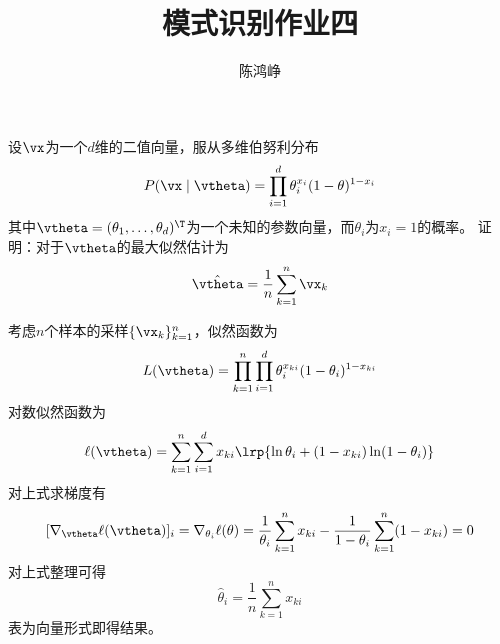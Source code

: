 \documentclass[reportComp]{thesis}
\title{模式识别作业四}
\subtitle{}
\author{陈鸿峥}
\begin{document}
\maketitle

\begin{question}[\textsection 3 Q4]
设$\vx$为一个$d$维的二值向量，服从多维伯努利分布
\[P(\vx\mid\vtheta)=\prod_{i=1}^d\theta_i^{x_i}(1-\theta)^{1-x_i}\]
其中$\vtheta=(\theta_1,\ldots,\theta_d)^\T$为一个未知的参数向量，而$\theta_i$为$x_i=1$的概率。
证明：对于$\vtheta$的最大似然估计为
\[\hat{\vtheta}=\frac{1}{n}\sum_{k=1}^n\vx_k\]
\end{question}
\begin{answer}
考虑$n$个样本的采样$\{\vx_k\}_{k=1}^{n}$，似然函数为
\[L(\vtheta)=\prod_{k=1}^n\prod_{i=1}^d\theta_i^{x_{ki}}(1-\theta_i)^{1-x_{ki}}\]
对数似然函数为
\[\ell(\vtheta)=\sum_{k=1}^n\sum_{i=1}^dx_{ki}\lrp{\ln\theta_i+(1-x_{ki})\ln(1-\theta_i)}\]
对上式求梯度有
\[[\nabla_{\vtheta}\ell(\vtheta)]_i=\nabla_{\theta_i}\ell(\theta)=\frac{1}{\theta_i}\sum_{k=1}^nx_{ki}-\frac{1}{1-\theta_i}\sum_{k=1}^n(1-x_{ki})=0\]
对上式整理可得
\[\hat{\theta}_i=\frac{1}{n}\sum_{k=1}^nx_{ki}\]
表为向量形式即得结果。
\end{answer}
\end{document}
